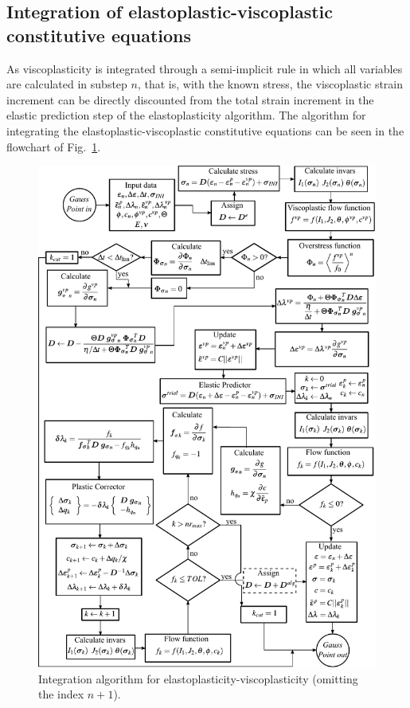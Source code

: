\documentclass[Journal,letterpaper]{ascelike-new}
\begin{document}
\subsection{Integration of elastoplastic-viscoplastic constitutive equations}

As viscoplasticity is integrated through a semi-implicit rule in which all variables are calculated in substep $n$, that is, with the known stress, the viscoplastic strain increment can be directly discounted from the total strain increment in the elastic prediction step of the elastoplasticity algorithm. The algorithm for integrating the elastoplastic-viscoplastic constitutive equations can be seen in the flowchart of Fig.~\ref{integração EPVP}.

\begin{figure}
	\centering
	\includegraphics[scale = 1.0]{integração EPVP.pdf}
	\caption{\label{integração EPVP}Integration algorithm for elastoplasticity-viscoplasticity (omitting the index $n+1$).}
\end{figure}
\end{document}
